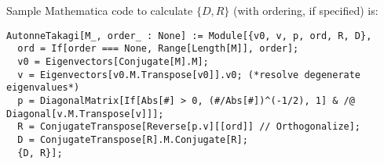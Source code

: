 \documentclass[CheatSheet]{subfiles}
\begin{document}
Sample Mathematica code to calculate $\{D,R\}$ (with ordering, if specified) is:
\begin{verbatim}
AutonneTakagi[M_, order_ : None] := Module[{v0, v, p, ord, R, D},
  ord = If[order === None, Range[Length[M]], order];
  v0 = Eigenvectors[Conjugate[M].M];
  v = Eigenvectors[v0.M.Transpose[v0]].v0; (*resolve degenerate eigenvalues*)
  p = DiagonalMatrix[If[Abs[#] > 0, (#/Abs[#])^(-1/2), 1] & /@ Diagonal[v.M.Transpose[v]]];
  R = ConjugateTranspose[Reverse[p.v][[ord]] // Orthogonalize];
  D = ConjugateTranspose[R].M.Conjugate[R];
  {D, R}];
\end{verbatim}
\end{document}
